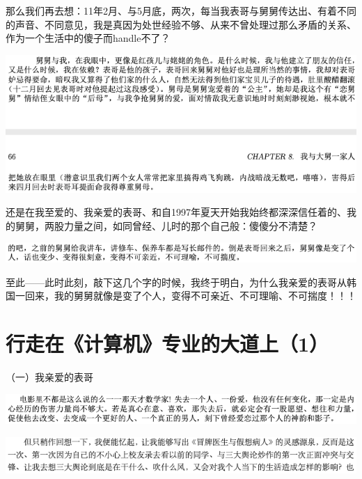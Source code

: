 \documentclass[9pt, b5paper]{article}
\begin{document}
那么我们再去想：11年2月、与5月底，两次，每当我表哥与舅舅传达出、有着不同的声音、不同意见，我是真因为处世经验不够、从来不曾处理过那么矛盾的关系、作为一个生活中的傻子而handle不了？

\begin{center}
\includegraphics[width=.9\linewidth]{./pic/backups_plans_20210423_103059.png}
\end{center}

还是在我至爱的、我亲爱的表哥、和自1997年夏天开始我始终都深深信任着的、我的舅舅，两股力量之间，如同曾经、儿时的那个自己般：傻傻分不清楚？

\begin{center}
\includegraphics[width=.9\linewidth]{./pic/backups_plans_20210422_232937.png}
\end{center}

至此——此时此刻，敲下这几个字的时候，我终于明白，为什么我亲爱的表哥从韩国一回来，我的舅舅就像是变了个人，变得不可亲近、不可理喻、不可揣度！！！

\section{行走在《计算机》专业的大道上（1）}
\label{sec:org2419644}

（一）我亲爱的表哥

\begin{center}
\includegraphics[width=.9\linewidth]{./pic/backups_plans_20210420_115239.png}
\end{center}

\begin{center}
\includegraphics[width=.9\linewidth]{./pic/backups_plans_20210424_085313.png}
\end{center}
\end{document}
